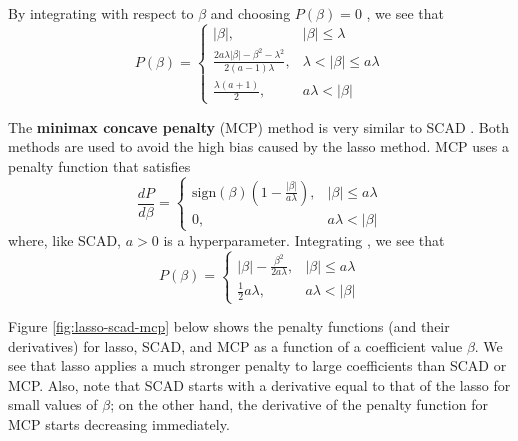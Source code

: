 \documentclass{article}
\newcommand{\sign}{\text{sign}}
\begin{document}
	By integrating with respect to $\beta$ and choosing $P(\beta) = 0$ \cite{breheny2016lasso}, we see that
	\begin{equation}
		P(\beta) = \left\{\begin{array}{ll}
			\vert \beta \vert,&\vert \beta \vert \leq \lambda\\
			\frac{2a\lambda\vert\beta\vert - \beta^2-\lambda^2}{2(a - 1)\lambda},&\lambda < \vert \beta \vert \leq a\lambda\\
			\frac{\lambda(a + 1)}{2},&a\lambda < \vert \beta \vert
		\end{array}\right.
	\end{equation}
	
	The \textbf{minimax concave penalty} (MCP) method is very similar to SCAD \cite{zhang2010nearly}. Both methods are used to avoid the high bias caused by the lasso method. MCP uses a penalty function that satisfies
	\begin{equation}
		\frac{dP}{d\beta} = \left\{\begin{array}{ll}
			\sign(\beta)\left(1 - \frac{\vert \beta \vert}{a\lambda}\right),& \vert \beta \vert \leq a\lambda\\
			0,&a\lambda < \vert \beta \vert
		\end{array}\right.
	\end{equation}
	where, like SCAD, $a>0$ is a hyperparameter. Integrating \cite{breheny2016lasso}, we see that
	\begin{equation}
		P(\beta) = \left\{\begin{array}{ll}
			\vert \beta \vert - \frac{\beta^2}{2a\lambda},&\vert \beta \vert \leq a\lambda\\
			\frac{1}{2}a\lambda,&a\lambda < \vert \beta \vert
		\end{array}\right.
	\end{equation}
	
	Figure \ref{fig:lasso-scad-mcp} below shows the penalty functions (and their derivatives) for lasso, SCAD, and MCP as a function of a coefficient value $\beta$. We see that lasso applies a much stronger penalty to large coefficients than SCAD or MCP. Also, note that SCAD starts with a derivative equal to that of the lasso for small values of $\beta$; on the other hand, the derivative of the penalty function for MCP starts decreasing immediately.
	
\end{document}
